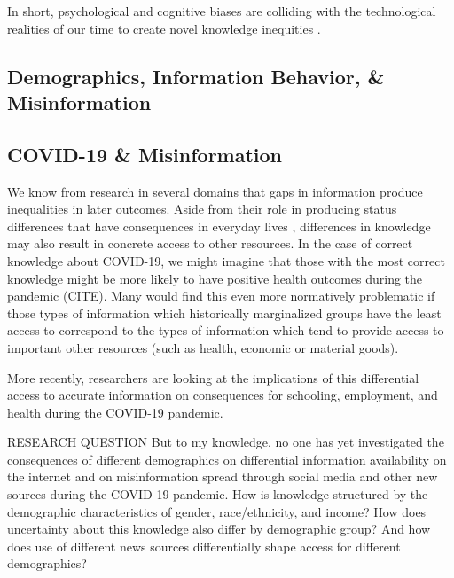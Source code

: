 \documentclass[11pt]{article}
\begin{document}
In short, psychological and cognitive biases \citep{DiMaggio1997} are colliding with the technological realities of our time to create novel knowledge inequities \citep{Mohammed2012}.


\subsection{Demographics, Information Behavior, \& Misinformation}


\subsection{COVID-19 \& Misinformation}

We know from research in several domains that gaps in information produce
inequalities in later outcomes. Aside from their role in producing status
differences that have consequences in everyday lives
\citep{Ridgeway2014,KingGender}, differences in knowledge may also result in
concrete access to other resources. In the case of correct knowledge about
COVID-19, we might imagine that those with the most correct knowledge might be
more likely to have positive health outcomes during the pandemic (CITE). Many
would find this even more normatively problematic if those types of information
which historically marginalized groups have the least access to correspond to
the types of information which tend to provide access to important other
resources (such as health, economic or material goods).

More recently, researchers are looking at the implications of this differential
access to accurate information on consequences for schooling, employment, and health
during the COVID-19 pandemic.





RESEARCH QUESTION
But to my knowledge, no one has yet investigated the consequences of different
demographics on differential information availability on the internet and on
misinformation spread through social media and other new sources during the COVID-19 pandemic.
How is knowledge structured by the demographic characteristics of gender,
race/ethnicity, and income? How does uncertainty about this knowledge also
differ by demographic group? And how does use of different news sources
differentially shape access for different demographics?
\end{document}
